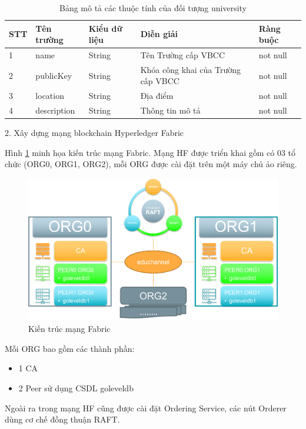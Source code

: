 \begin{table}[H]
\caption{Bảng mô tả các thuộc tính của đối tượng university}
	\label{table:assetuniversity}
	\begin{tabularx} {\textwidth} {|p{1cm}|p{3cm}|p{3cm}|X|p{2cm}|}
\hline
		STT &	Tên trường & Kiểu dữ liệu & Diễn giải & Ràng buộc \\ \hline
		1 & name	& String & Tên Trường cấp VBCC  & not null \\ \hline
		2 & publicKey & String  & Khóa công khai của Trường cấp VBCC  & not null \\ \hline
		3 & location	&  String & Địa điểm  &not null \\ \hline
		4 & description	& String & Thông tin mô tả  &not null \\ \hline
\end{tabularx}
\end{table}

2. Xây dựng mạng blockchain Hyperledger Fabric

Hình \ref{fig:fab_diagram} minh họa kiến trúc mạng Fabric. Mạng HF được triển khai gồm có 03 tổ chức (ORG0, ORG1, ORG2), mỗi ORG được cài đặt trên một máy chủ ảo riêng.

\begin{figure}[htbp]
\centering
\includegraphics[width=.8\linewidth]{img/fab.png}
\caption{Kiến trúc mạng Fabric}
\label{fig:fab_diagram}
\end{figure}

Mỗi ORG bao gồm các thành phần:

\begin{itemize}
    \item 1 CA
    \item 2 Peer sử dụng CSDL goleveldb
\end{itemize}

Ngoài ra trong mạng HF cũng được cài đặt Ordering Service, các nút Orderer dùng cơ chế đồng thuận RAFT.

